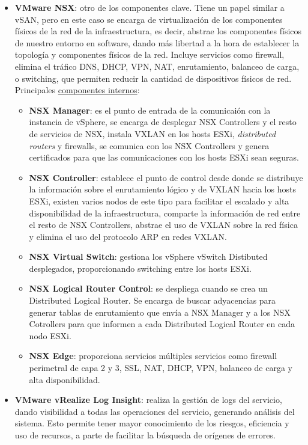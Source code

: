 \begin{itemize}
    \item \textbf{VMware NSX}: otro de los componentes clave. Tiene un papel similar a vSAN, pero en este caso se encarga de virtualización de los componentes físicos de la red de la infraestructura, es decir, abstrae los componentes físicos de nuestro entorno en software, dando más libertad a la hora de establecer la topología y componentes físicos de la red. Incluye servicios como firewall, elimina el tráfico  DNS, DHCP, VPN, NAT, enrutamiento, balanceo de carga, o switching, que permiten reducir la cantidad de dispositivos físicos de red.\\
    Principales \underline{componentes internos}\cite{componentesNSX}:
    \begin{itemize}
        \item \textbf{NSX Manager}: es el punto de entrada de la comunicaión con la instancia de vSphere, se encarga de desplegar NSX Controllers y el resto de servicios de NSX, instala VXLAN en los hosts ESXi, \textit{distributed routers} y firewalls, se comunica con los NSX Controllers y genera certificados para que las comunicaciones con los hosts ESXi sean seguras.
        \item \textbf{NSX Controller}: establece el punto de control desde donde se distribuye la información sobre el enrutamiento lógico y de VXLAN hacia los hosts ESXi, existen varios nodos de este tipo para facilitar el escalado y alta disponibilidad de la infraestructura, comparte la información de red entre el resto de NSX Controllers, abstrae el uso de VXLAN sobre la red física y elimina el uso del protocolo ARP en redes VXLAN. 
        \item \textbf{NSX Virtual Switch}: gestiona los vSphere vSwitch Distibuted desplegados, proporcionando switching entre los hosts ESXi.
        \item \textbf{NSX Logical Router Control}: se despliega cuando se crea un Distributed Logical Router. Se encarga de buscar adyacencias para generar tablas de enrutamiento que envía a NSX Manager y a los NSX Cotrollers para que informen a cada Distributed Logical Router en cada nodo ESXi.
        \item \textbf{NSX Edge}: proporciona servicios múltiples servicios como firewall perimetral de capa 2 y 3, SSL, NAT, DHCP, VPN, balanceo de carga y alta disponibilidad.
    \end{itemize}
    \item \textbf{VMware vRealize Log Insight}: realiza la gestión de logs del servicio, dando visibilidad a todas las operaciones del servicio, generando análisis del sistema. Esto permite tener mayor conocimiento de los riesgos, eficiencia y uso de recursos, a parte de facilitar la búsqueda de orígenes de errores.\\

\end{itemize}
